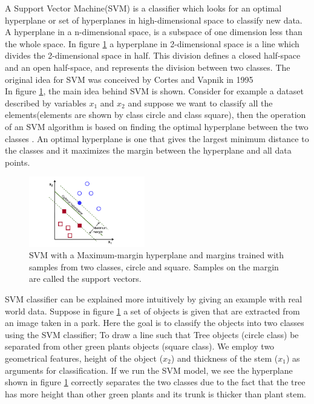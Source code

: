 A Support Vector Machine(SVM) is a classifier which looks for an optimal hyperplane or set of hyperplanes in high-dimensional space to classify new data. A hyperplane in a n-dimensional space, is a subspace of one dimension less than the whole space. In figure \ref{fig:SVM} a hyperplane in 2-dimensional space is a line which divides the 2-dimensional space in half. This division defines a closed half-space and an open half-space, and represents the division between two classes. The original idea for SVM was conceived by Cortes and Vapnik in 1995 \cite{cortes1995support} \\
In figure \ref{fig:SVM}, the main idea behind SVM is shown. Consider for example a dataset described by variables $x_1$ and $x_2$ and suppose we want to classify all the elements(elements are shown by class circle and class square), then the operation of an SVM algorithm is based on finding the optimal hyperplane between the two classes \cite{opencv_library}. An optimal hyperplane is one that gives the largest minimum distance to the classes and it maximizes the margin between the hyperplane and all data points. %

\begin{figure}[H]
    \includegraphics[width=0.45\textwidth]{./img/SVM.png}
    \caption{\footnotesize{SVM with a Maximum-margin hyperplane and margins trained with samples from two classes, circle and square. Samples on the margin are called the support vectors.\cite{wiki:SVM}}}
    \label{fig:SVM}
\end{figure}

SVM classifier can be explained more intuitively by giving an example with real world data. Suppose in figure \ref{fig:SVM} a set of objects is given that are extracted from an image taken in a park. Here the goal is to classify the objects into two classes using the SVM classifier; To draw a line such that Tree objects (circle class) be separated from other  green plants objects (square class). We employ two geometrical features, height of the object ($x_2$) and thickness of the stem ($x_1$) as arguments for classification. If we run the SVM model, we see the hyperplane shown in figure \ref{fig:SVM} correctly separates the two classes due to the fact that the tree has more height than other green plants and its trunk is thicker than plant stem.\\  

